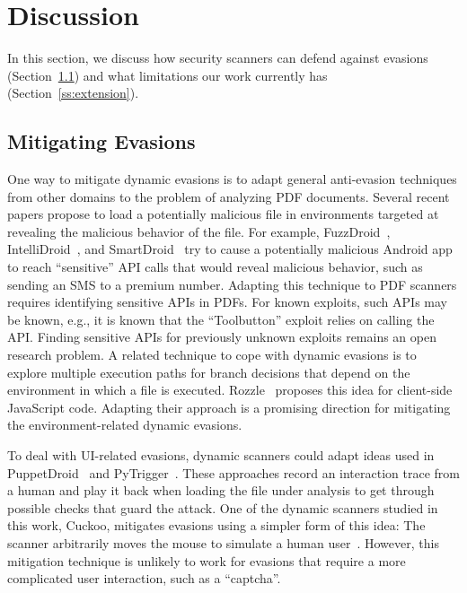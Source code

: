 \section{Discussion}
\label{ss: discussion}

In this section, we discuss how security scanners can defend against evasions (Section~\ref{ss:anti-evasion})
and what limitations our work currently has (Section~\ref{ss:extension}).

\subsection{Mitigating Evasions}
\label{ss:anti-evasion}

One way to mitigate dynamic evasions is to adapt general anti-evasion techniques from other domains to the problem of analyzing PDF documents.
Several recent papers propose to load a potentially malicious file in environments targeted at revealing the malicious behavior of the file.
For example, FuzzDroid~\cite{rasthofer2017making}, IntelliDroid~\cite{wong2016intellidroid}, and SmartDroid~\cite{zheng2012smartdroid} try to cause a potentially malicious Android app to reach ``sensitive'' API calls that would reveal malicious behavior, such as sending an SMS to a premium number.
Adapting this technique to PDF scanners requires identifying sensitive APIs in PDFs.
For known exploits, such APIs may be known, e.g., it is known that the ``Toolbutton'' exploit relies on calling the  API.
Finding sensitive APIs for previously unknown exploits remains an open research problem.
A related technique to cope with dynamic evasions is to explore multiple execution paths for branch decisions that depend on the environment in which a file is executed.
Rozzle~\cite{rozzle-de-cloaking-internet-malware-2} proposes this idea for client-side JavaScript code.
Adapting their approach is a promising direction for mitigating the environment-related dynamic evasions.

To deal with UI-related evasions, dynamic scanners could adapt ideas used in PuppetDroid~\cite{gianazza2014puppetdroid} and PyTrigger~\cite{fleck2013pytrigger}.
These approaches record an interaction trace from a human and play it back when loading the file under analysis to get through possible checks that guard the attack.
One of the dynamic scanners studied in this work, Cuckoo, mitigates evasions using a simpler form of this idea: The scanner arbitrarily moves the mouse to simulate a human user~\cite{cuckoo_mouse_movement}.
However, this mitigation technique is unlikely to work for evasions that require a more complicated user interaction, such as a ``captcha''.

